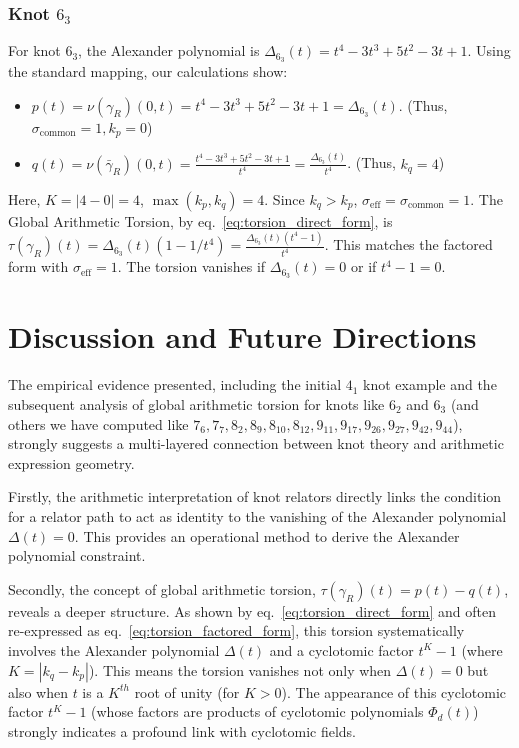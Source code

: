 \documentclass{article}[a4paper,12pt]
\begin{document}
\subsubsection{Knot $6_3$}
For knot $6_3$, the Alexander polynomial is $\Delta_{6_3}(t) = t^4 - 3t^3 + 5t^2 - 3t + 1$.
Using the standard mapping, our calculations show:
\begin{itemize}
    \item $p(t) = \nu(\gamma_R)(0,t) = t^4 - 3t^3 + 5t^2 - 3t + 1 = \Delta_{6_3}(t)$.
    (Thus, $\sigma_{\text{common}}=1, k_p=0$)
    \item $q(t) = \nu(\bar{\gamma}_R)(0,t) = \frac{t^4 - 3t^3 + 5t^2 - 3t + 1}{t^4} = \frac{\Delta_{6_3}(t)}{t^4}$.
    (Thus, $k_q=4$)
\end{itemize}
Here, $K = |4-0| = 4$, $\max(k_p,k_q)=4$. Since $k_q > k_p$, $\sigma_{\text{eff}} = \sigma_{\text{common}} = 1$.
The Global Arithmetic Torsion, by eq.~\eqref{eq:torsion_direct_form}, is $\tau(\gamma_R)(t) = \Delta_{6_3}(t)(1 - 1/t^4) = \frac{\Delta_{6_3}(t)(t^4-1)}{t^4}$.
This matches the factored form with $\sigma_{\text{eff}}=1$. The torsion vanishes if $\Delta_{6_3}(t)=0$ or if $t^4-1=0$.

\section{Discussion and Future Directions}

The empirical evidence presented, including the initial $4_1$ knot example and the subsequent analysis of global arithmetic torsion for knots like $6_2$ and $6_3$ (and others we have computed like $7_6, 7_7, 8_2, 8_9, 8_{10}, 8_{12}, 9_{11}, 9_{17}, 9_{26}, 9_{27}, 9_{42}, 9_{44}$), strongly suggests a multi-layered connection between knot theory and arithmetic expression geometry.

Firstly, the arithmetic interpretation of knot relators directly links the condition for a relator path to act as identity to the vanishing of the Alexander polynomial $\Delta(t)=0$. This provides an operational method to derive the Alexander polynomial constraint.

Secondly, the concept of global arithmetic torsion, $\tau(\gamma_R)(t) = p(t) - q(t)$, reveals a deeper structure. As shown by eq.~\eqref{eq:torsion_direct_form} and often re-expressed as eq.~\eqref{eq:torsion_factored_form}, this torsion systematically involves the Alexander polynomial $\Delta(t)$ and a cyclotomic factor $t^K-1$ (where $K = |k_q-k_p|$). This means the torsion vanishes not only when $\Delta(t)=0$ but also when $t$ is a $K^{th}$ root of unity (for $K>0$). The appearance of this cyclotomic factor $t^K-1$ (whose factors are products of cyclotomic polynomials $\Phi_d(t)$) strongly indicates a profound link with cyclotomic fields.
\end{document}
